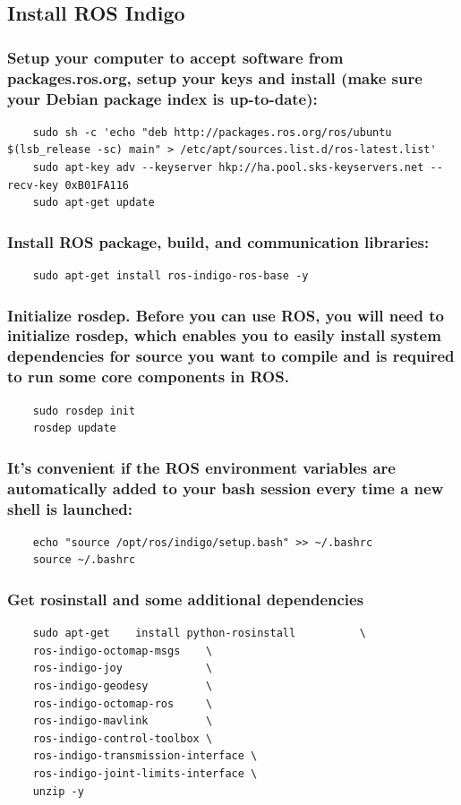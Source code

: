 \documentclass{report}
\begin{document}
\subsection{Install ROS Indigo}
\subsubsection{Setup your computer to accept software from packages.ros.org, setup your keys and install (make sure your Debian package index is up-to-date):}
\begin{lstlisting}
	sudo sh -c 'echo "deb http://packages.ros.org/ros/ubuntu $(lsb_release -sc) main" > /etc/apt/sources.list.d/ros-latest.list'
	sudo apt-key adv --keyserver hkp://ha.pool.sks-keyservers.net --recv-key 0xB01FA116
	sudo apt-get update
\end{lstlisting}

\subsubsection{Install ROS package, build, and communication libraries:}
\begin{lstlisting}
	sudo apt-get install ros-indigo-ros-base -y
\end{lstlisting}

\subsubsection{Initialize rosdep. Before you can use ROS, you will need to initialize rosdep, which enables you to easily install system dependencies for source you want to compile and is required to run some core components in ROS.}
\begin{lstlisting}
	sudo rosdep init
	rosdep update
\end{lstlisting}

\subsubsection{It's convenient if the ROS environment variables are automatically added to your bash session every time a new shell is launched:}
\begin{lstlisting}
	echo "source /opt/ros/indigo/setup.bash" >> ~/.bashrc
	source ~/.bashrc
\end{lstlisting}

\subsubsection{Get rosinstall and some additional dependencies}
\begin{lstlisting}
	sudo apt-get    install python-rosinstall          \
	ros-indigo-octomap-msgs    \
	ros-indigo-joy             \
	ros-indigo-geodesy         \
	ros-indigo-octomap-ros     \
	ros-indigo-mavlink         \
	ros-indigo-control-toolbox \
	ros-indigo-transmission-interface \
	ros-indigo-joint-limits-interface \
	unzip -y
\end{lstlisting}
\end{document}
